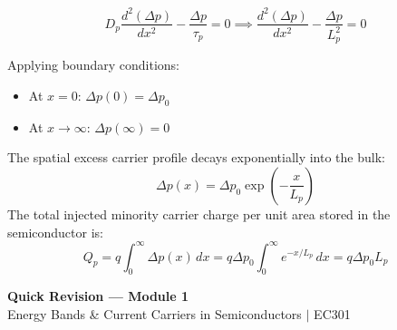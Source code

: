 \documentclass[12pt,a4paper]{article}
\begin{document}
\begin{equation}
  D_p \frac{d^2 (\Delta p)}{dx^2} - \frac{\Delta p}{\tau_p} = 0 \implies \frac{d^2 (\Delta p)}{dx^2} - \frac{\Delta p}{L_p^2} = 0
\end{equation}

Applying boundary conditions:
\begin{itemize}[leftmargin=*, itemsep=2pt]
  \item At $x = 0$: $\Delta p(0) = \Delta p_0$
  \item At $x \to \infty$: $\Delta p(\infty) = 0$
\end{itemize}

The spatial excess carrier profile decays exponentially into the bulk:
\begin{equation}
  \Delta p(x) = \Delta p_0 \exp\left(-\frac{x}{L_p}\right)
\end{equation}
The total injected minority carrier charge per unit area stored in the semiconductor is:
\begin{equation}
  Q_p = q \int_0^\infty \Delta p(x)\,dx = q \Delta p_0 \int_0^\infty e^{-x/L_p}\,dx = q \Delta p_0 L_p
\end{equation}

\newpage
\begin{center}
  {\large\bfseries\color{myred} Quick Revision --- Module 1}\\[3pt]
  {\small\color{mydark} Energy Bands \& Current Carriers in Semiconductors $|$ EC301}
\end{center}
\noindent{\color{myred}\rule{\linewidth}{1.2pt}}
\vspace{4pt}
\end{document}

